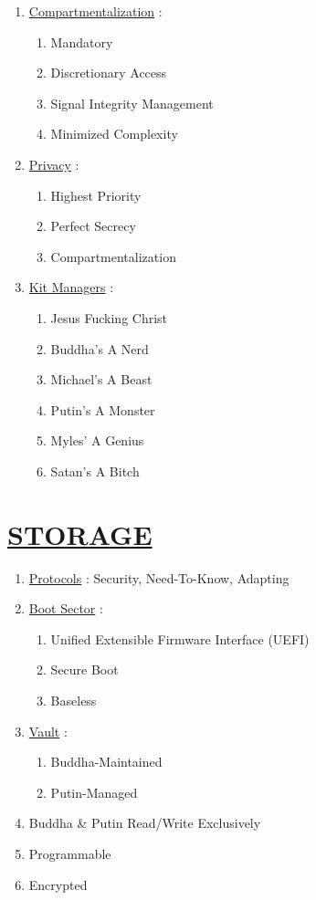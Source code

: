 \documentclass[11pt]{article}
\begin{document}
\begin{enumerate}
	\item[] \ul{Compartmentalization} :
	\begin{enumerate}
		\item[] Mandatory
		\item[] Discretionary Access
		\item[] Signal Integrity Management
		\item[] Minimized Complexity
	\end{enumerate}

	\item[] \ul{Privacy} :
	\begin{enumerate}
		\item[] Highest Priority
		\item[] Perfect Secrecy
		\item[] Compartmentalization
	\end{enumerate}

	\item[] \ul{Kit Managers} :
	\begin{enumerate}
		\item[] Jesus Fucking Christ
		\item[] Buddha's A Nerd
		\item[] Michael's A Beast
		\item[] Putin's A Monster
		\item[] Myles' A Genius
		\item[] Satan's A Bitch
	\end{enumerate}

\end{enumerate}


\section*{\ul{STORAGE}}
\begin{enumerate}
	\item[] \ul{Protocols} : Security, Need-To-Know, Adapting
	
	\item[] \ul{Boot Sector} :
	\begin{enumerate}
		\item[] Unified Extensible Firmware Interface (UEFI)
		\item[] Secure Boot
		\item[] Baseless
	\end{enumerate}

	\item[] \ul{Vault} :
	\begin{enumerate}
		\item[] Buddha-Maintained
		\item[] Putin-Managed
	\end{enumerate}
	
	\item[] Buddha \& Putin Read/Write Exclusively
	\item[] Programmable
	\item[] Encrypted

\end{enumerate}
\end{document}
